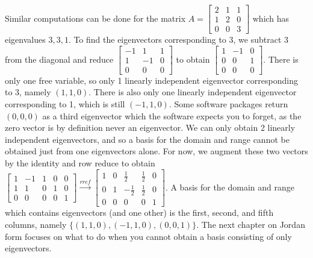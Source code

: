 \begin{example}
Similar computations can be done for the matrix
$A=
\begin{bmatrix}
 2 & 1 & 1 \\
 1 & 2 & 0 \\
 0 & 0 & 3
\end{bmatrix}
$ which has eigenvalues $3,3,1$. To find the eigenvectors corresponding to 3, we subtract 3 from the diagonal and reduce 
$
\begin{bmatrix}
 -1 & 1 & 1 \\
 1 & -1 & 0 \\
 0 & 0 & 0
\end{bmatrix}
$
to obtain
$
\begin{bmatrix}
 1 & -1 & 0 \\
 0 & 0 & 1\\
 0 & 0 & 0
\end{bmatrix}
$. 
There is only one free variable, so only 1 linearly independent eigenvector corresponding to 3, namely $(1,1,0)$. There is also only one linearly independent eigenvector corresponding to 1, which is still $(-1,1,0)$. 
Some software packages return $(0,0,0)$ as a third eigenvector which the software expects you to forget, as the zero vector is by definition never an eigenvector. 
We can only obtain 2 linearly independent eigenvectors, and so a basis for the domain and range cannot be obtained just from one eigenvectors alone. For now, we augment these two vectors by the identity and row reduce to obtain 
$
\begin{bmatrix}
 1 & -1 & 1 & 0 & 0 \\
 1 & 1 & 0 & 1 & 0 \\
 0 & 0 & 0 & 0 & 1
\end{bmatrix}
\xrightarrow{rref}
\begin{bmatrix}
 1 & 0 & \frac{1}{2} & \frac{1}{2} & 0 \\
 0 & 1 & -\frac{1}{2} & \frac{1}{2} & 0 \\
 0 & 0 & 0 & 0 & 1
\end{bmatrix}
$. A basis for the domain and range which contains eigenvectors (and one other) is the first, second, and fifth columns, namely $\{ (1,1,0), (-1,1,0), (0,0,1) \}$.  The next chapter on Jordan form focuses on what to do when you cannot obtain a basis consisting of only eigenvectors. 
\end{example}













